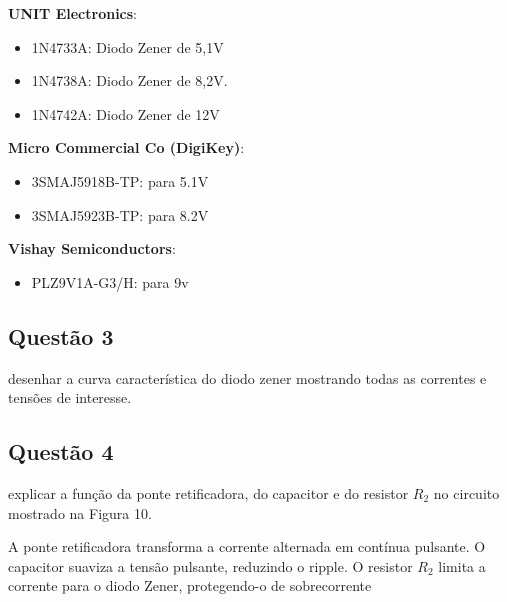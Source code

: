 \documentclass{article}
\begin{document}
\textbf{UNIT Electronics}:
\begin{itemize}
\large
    \item 1N4733A: Diodo Zener de 5,1V
    \item 1N4738A: Diodo Zener de 8,2V.
    \item 1N4742A: Diodo Zener de 12V
\end{itemize}

\vspace{\baselineskip}

\textbf{Micro Commercial Co (DigiKey)}:
\begin{itemize}
\large
    \item 3SMAJ5918B-TP: para 5.1V 
    \item 3SMAJ5923B-TP: para 8.2V
\end{itemize}

\vspace{\baselineskip}


\textbf{Vishay Semiconductors}:
\begin{itemize}
\large
    \item PLZ9V1A-G3/H: para 9v
\end{itemize}

\subsection{Questão 3}

\begin{tcolorbox}[title=\large Questão 3, colback=red!5!white, colframe=red!75!black]
    \large
    desenhar a curva característica do diodo zener mostrando todas as correntes e tensões de interesse.
\end{tcolorbox}

\subsection{Questão 4}

\begin{tcolorbox}[title=\large Questão 4, colback=red!5!white, colframe=red!75!black]
    \large
    explicar a função da ponte retificadora, do capacitor e do resistor $R_2$ no circuito mostrado na Figura 10.
\end{tcolorbox}

A ponte retificadora transforma a corrente alternada em contínua pulsante. O capacitor suaviza a tensão pulsante, reduzindo o ripple. O resistor $R_2$ limita a corrente para o diodo Zener, protegendo-o de sobrecorrente
\end{document}
